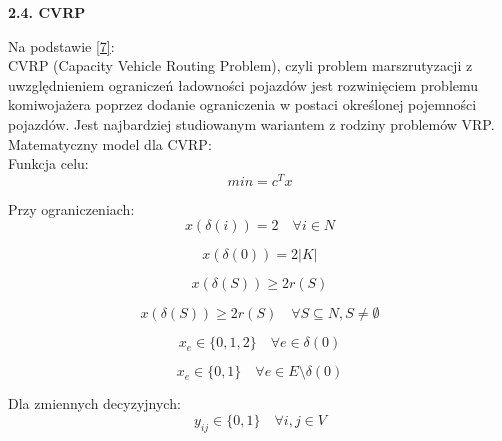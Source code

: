 \documentclass[a4paper, twoside, 12pt, justified]{article}
\begin{document}
	\begin{flushleft}
		\begin{large}
			\textbf{2.4. CVRP}
		\end{large}
	\end{flushleft}
	\vspace{5mm} %
	
	Na podstawie \hyperlink{cvrp-irnich}{[7]}:\\
	CVRP (Capacity Vehicle Routing Problem), czyli problem marszrutyzacji z uwzględnieniem ograniczeń ładowności pojazdów jest rozwinięciem problemu komiwojażera poprzez dodanie ograniczenia w postaci określonej pojemności pojazdów. Jest najbardziej studiowanym wariantem z rodziny problemów VRP. Matematyczny model dla CVRP:\\
	
	Funkcja celu:\\
	\begin{equation}
	{min= c^Tx}
	\end{equation}
	
	Przy ograniczeniach:\\
	\begin{equation}
	{x(\delta(i)) = 2 \quad \forall i \in N }
	\end{equation}
	
	\begin{equation}
	{x(\delta(0)) = 2|K| }
	\end{equation}
	
	\begin{equation}
	{x(\delta(S)) \geq 2r(S) }
	\end{equation}
	
	\begin{equation}
	{x(\delta(S)) \geq 2r(S) \quad \forall S \subseteq N, S \neq \emptyset}
	\end{equation}
	
	\begin{equation}
	{x_e \in \{0,1,2\} \quad \forall e \in \delta(0)}
	\end{equation}
	
	\begin{equation}
	{x_e \in \{0,1\} \quad \forall e \in E \setminus \delta(0)}
	\end{equation}
	
	
	Dla zmiennych decyzyjnych:\\
	
	\begin{equation}
	{ y_{ij} \in \{0,1\} \quad \forall i,j \in V }
	\end{equation}
	
\end{document}
